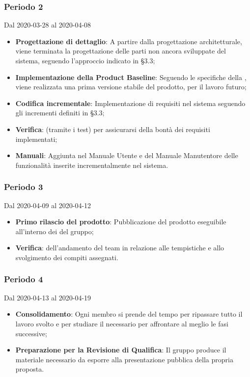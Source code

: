 \subsubsection{Periodo 2} 
Dal 2020-03-28 al 2020-04-08\\
\begin{itemize}
	\item \textbf{Progettazione di dettaglio}: A partire dalla progettazione architetturale, viene terminata la progettazione delle parti non ancora sviluppate del sistema, seguendo l'approccio indicato in §3.3;
	\item \textbf{Implementazione della Product Baseline}: Seguendo le specifiche della , viene realizzata una prima versione stabile del prodotto,  per il lavoro futuro;
	\item \textbf{Codifica incrementale}: Implementazione di requisiti nel sistema seguendo gli incrementi definiti in §3.3;
	\item \textbf{Verifica}:  (tramite i test) per assicurarsi della bontà dei requisiti implementati;
	\item \textbf{Manuali}: Aggiunta nel Manuale Utente e del Manuale Manutentore delle funzionalità inserite incrementalmente nel sistema.
\end{itemize}
\subsubsection{Periodo 3}
Dal 2020-04-09 al 2020-04-12\\
\begin{itemize}
	\item \textbf{Primo rilascio del prodotto}: Pubblicazione del prodotto eseguibile all'interno dei  del gruppo;
	\item \textbf{Verifica}:  dell'andamento del team in relazione alle tempistiche e allo svolgimento dei compiti assegnati.
\end{itemize}
\subsubsection{Periodo 4} 
Dal 2020-04-13 al 2020-04-19\\
\begin{itemize}
	\item \textbf{Consolidamento}: Ogni membro si prende del tempo per ripassare tutto il lavoro svolto e per studiare il necessario per affrontare al meglio le fasi successive;
	\item \textbf{Preparazione per la Revisione di Qualifica}: Il gruppo produce il materiale necessario da esporre alla presentazione pubblica della propria proposta.
\end{itemize}

